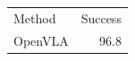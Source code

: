 \caption{Published success rates on LIBERO.}
\label{tab:base}
\begin{tabular}{lr}
Method & Success \\
OpenVLA & 96.8 \\
\end{tabular}
